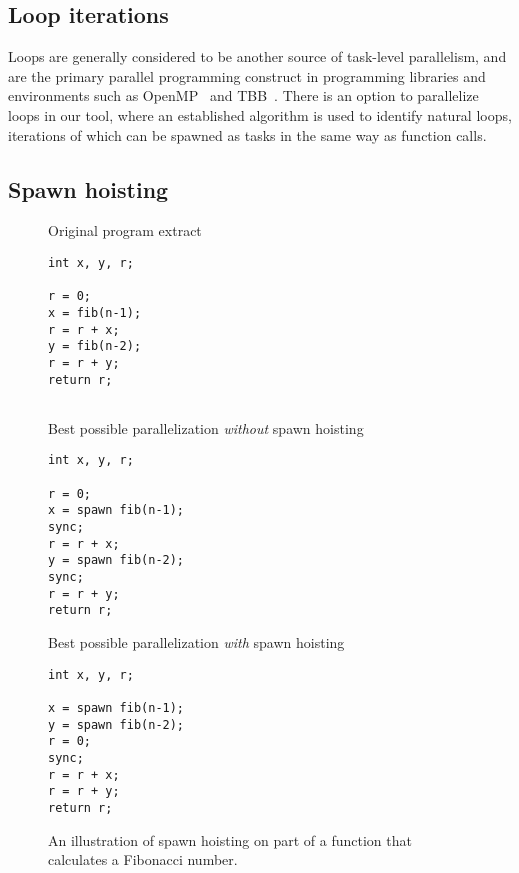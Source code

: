 \subsection{Loop iterations}
Loops are generally considered to be another source of task-level parallelism, and are the primary parallel programming construct in programming libraries and environments such as OpenMP~\cite{dagum98openmp} and TBB~\cite{reinders07intel}.
There is an option to parallelize loops in our tool, where an established algorithm \cite{aho86compilers, muchnick97advanced} is used to identify natural loops, iterations of which can be spawned as tasks in the same way as function calls.

\subsection{Spawn hoisting}

\begin{figure}
  \begin{center}
  \scriptsize
  \begin{SubFloat}{\label{spawn:orig}Original program extract}
    \begin{minipage}{0.7in}
      \begin{verbatim}
int x, y, r;

r = 0;
x = fib(n-1);
r = r + x;
y = fib(n-2);
r = r + y;
return r;


      \end{verbatim}
    \end{minipage}%
  \end{SubFloat}%
  \qquad
  \begin{SubFloat}{\label{spawn:without}Best possible parallelization \emph{without} spawn hoisting}
    \begin{minipage}{1.0in}
      \begin{verbatim}
int x, y, r;

r = 0;
x = spawn fib(n-1);
sync;
r = r + x;
y = spawn fib(n-2);
sync;
r = r + y;
return r;
      \end{verbatim}
    \end{minipage}%
  \end{SubFloat}%
  \qquad
  \begin{SubFloat}{\label{spawn:with}Best possible parallelization \emph{with} spawn hoisting}
    \begin{minipage}{1.0in}
      \begin{verbatim}
int x, y, r;

x = spawn fib(n-1);
y = spawn fib(n-2);
r = 0;
sync;
r = r + x;
r = r + y;
return r;

      \end{verbatim}
    \end{minipage}%
  \end{SubFloat}%
  \end{center}
  \caption{An illustration of spawn hoisting on part of a function that calculates a Fibonacci number.}
  \label{spawn}
\end{figure}

